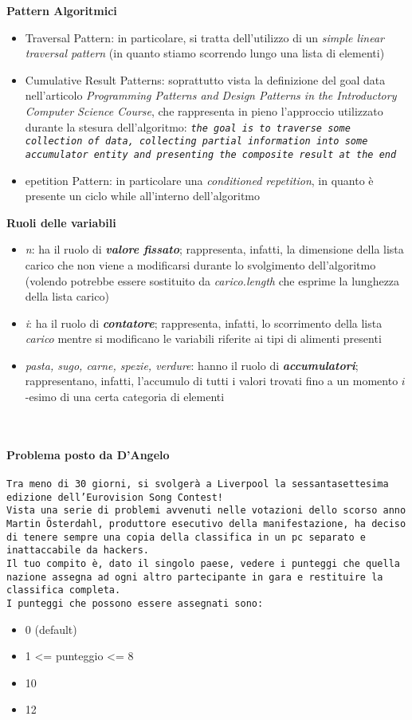 \documentclass[a4paper]{article}
\begin{document}
\textbf{Pattern Algoritmici}
\begin{itemize}
	\item Traversal Pattern: in particolare, si tratta dell’utilizzo di un \textit{simple linear traversal pattern} (in quanto stiamo scorrendo lungo una lista di elementi)
	\item Cumulative Result Patterns: soprattutto vista la definizione del goal data nell’articolo \textit{Programming Patterns and Design Patterns in the Introductory Computer Science Course}, che rappresenta in pieno l’approccio utilizzato durante la stesura dell’algoritmo: 
\textit{\texttt{the goal is to traverse some collection of data, collecting partial information into some accumulator entity and presenting the composite result at the end}}
\item epetition Pattern: in particolare una \textit{conditioned repetition}, in quanto è presente un ciclo while all’interno dell’algoritmo

\end{itemize}
\textbf{Ruoli delle variabili}

\begin{itemize}
	\item \textit{n}: ha il ruolo di \textit{\textbf{valore fissato}}; rappresenta, infatti, la dimensione della lista carico che non viene a modificarsi durante lo svolgimento dell’algoritmo (volendo potrebbe essere sostituito da \textit{carico.length} che esprime la lunghezza della lista carico)
	\item \textit{i}: ha il ruolo di \textit{\textbf{contatore}}; rappresenta, infatti, lo scorrimento della lista \textit{carico} mentre si modificano le variabili riferite ai tipi di alimenti presenti 
	\item \textit{pasta, sugo, carne, spezie, verdure}: hanno il ruolo di \textit{\textbf{accumulatori}};
rappresentano, infatti, l’accumulo di tutti i valori trovati fino a un momento $i$-esimo di una certa categoria di elementi 
\end{itemize}
\
\newpage
\paragraph{Problema posto da D'Angelo}
\texttt{Tra meno di 30 giorni, si svolgerà a Liverpool la sessantasettesima edizione dell’Eurovision Song Contest!\\Vista una serie di problemi avvenuti nelle votazioni dello scorso anno Martin Österdahl, produttore esecutivo della manifestazione, ha deciso di tenere sempre una copia della classifica in un pc separato e inattaccabile da hackers.\\Il tuo compito è, dato il singolo paese, vedere i punteggi che quella nazione assegna ad ogni altro partecipante in gara e restituire la classifica completa.\\I punteggi che possono essere assegnati sono:}
\begin{itemize}
\item 0 (default)
\item 1 <= punteggio <= 8
\item 10
\item 12
\end{itemize}
\end{document}
